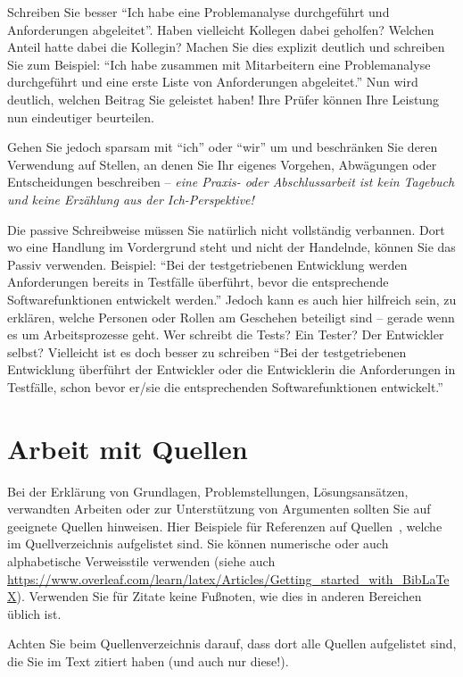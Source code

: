 Schreiben Sie besser \enquote{Ich habe eine Problemanalyse durchgeführt und Anforderungen abgeleitet}. Haben vielleicht Kollegen dabei geholfen? Welchen Anteil hatte dabei die Kollegin? Machen Sie dies explizit deutlich und schreiben Sie zum Beispiel: \enquote{Ich habe zusammen mit Mitarbeitern eine Problemanalyse durchgeführt und eine erste Liste von Anforderungen abgeleitet.} Nun wird deutlich, welchen Beitrag Sie geleistet haben! Ihre Prüfer können Ihre Leistung nun eindeutiger beurteilen.

Gehen Sie jedoch sparsam mit \enquote{ich} oder \enquote{wir} um und beschränken Sie deren Verwendung auf Stellen, an denen Sie Ihr eigenes Vorgehen, Abwägungen oder Entscheidungen beschreiben -- {\em eine Praxis- oder Abschlussarbeit ist kein Tagebuch und keine Erzählung aus der Ich-Perspektive!}

Die passive Schreibweise müssen Sie natürlich nicht vollständig verbannen. Dort wo eine Handlung im Vordergrund steht und nicht der Handelnde, können Sie das Passiv verwenden. Beispiel: \enquote{Bei der testgetriebenen Entwicklung werden Anforderungen bereits in Testfälle überführt, bevor die entsprechende Softwarefunktionen entwickelt werden.} Jedoch kann es auch hier hilfreich sein, zu erklären, welche Personen oder Rollen am Geschehen beteiligt sind -- gerade wenn es um Arbeitsprozesse geht. Wer schreibt die Tests? Ein Tester? Der Entwickler selbst? Vielleicht ist es doch besser zu schreiben \enquote{Bei der testgetriebenen Entwicklung überführt der Entwickler oder die Entwicklerin die Anforderungen in Testfälle, schon bevor er/sie die entsprechenden Softwarefunktionen entwickelt.}

\section{Arbeit mit Quellen}
\label{sec:arbeit-mit-quellen}

Bei der Erklärung von Grundlagen, Problemstellungen, Lösungsansätzen, verwandten Arbeiten oder zur Unterstützung von Argumenten sollten Sie auf geeignete Quellen hinweisen. Hier Beispiele für Referenzen auf Quellen~\cite{Greenyer2007,DBLP:conf/calco/KonigWK23}, welche im Quellverzeichnis aufgelistet sind. 
Sie können numerische oder auch alphabetische Verweisstile verwenden (siehe auch \url{https://www.overleaf.com/learn/latex/Articles/Getting_started_with_BibLaTeX}). Verwenden Sie für Zitate keine Fußnoten, wie dies in anderen Bereichen üblich ist.

Achten Sie beim Quellenverzeichnis darauf, dass dort alle Quellen aufgelistet sind, die Sie im Text zitiert haben (und auch nur diese!).

